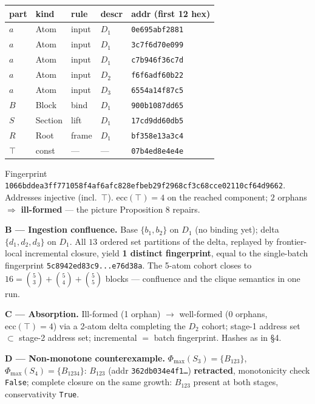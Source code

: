 \documentclass[
  10pt,
]{article}
\begin{document}
\begin{longtable}[]{@{}lllll@{}}
\toprule\noalign{}
part & kind & rule & descr & addr (first 12 hex) \\
\midrule\noalign{}
\endhead
\bottomrule\noalign{}
\endlastfoot
\(a\) & Atom & input & \(D_1\) & \texttt{0e695abf2881} \\
\(a\) & Atom & input & \(D_1\) & \texttt{3c7f6d70e099} \\
\(a\) & Atom & input & \(D_1\) & \texttt{c7b946f36c7d} \\
\(a\) & Atom & input & \(D_2\) & \texttt{f6f6adf60b22} \\
\(a\) & Atom & input & \(D_3\) & \texttt{6554a14f87c5} \\
\(B\) & Block & bind & \(D_1\) & \texttt{900b1087dd65} \\
\(S\) & Section & lift & \(D_1\) & \texttt{17cd9dd60db5} \\
\(R\) & Root & frame & \(D_1\) & \texttt{bf358e13a3c4} \\
\(\top\) & const & --- & --- & \texttt{07b4ed8e4e4e} \\
\end{longtable}

Fingerprint
\texttt{1066bddea3ff771058f4af6afc828efbeb29f2968cf3c68cce02110cf64d9662}.
Addresses injective (incl.~\(\top\)). \(\mathrm{ecc}(\top) = 4\) on the
reached component; \(2\) orphans \(\Rightarrow\) \textbf{ill-formed} ---
the picture Proposition 8 repairs.

\textbf{B --- Ingestion confluence.} Base \(\{b_1, b_2\}\) on \(D_1\)
(no binding yet); delta \(\{d_1, d_2, d_3\}\) on \(D_1\). All \(13\)
ordered set partitions of the delta, replayed by frontier-local
incremental closure, yield \textbf{1 distinct fingerprint}, equal to the
single-batch fingerprint \texttt{5c8942ed83c9...e76d38a}. The 5-atom
cohort closes to \(16 = \binom{5}{3} + \binom{5}{4} + \binom{5}{5}\)
blocks --- confluence and the clique semantics in one run.

\textbf{C --- Absorption.} Ill-formed (1 orphan) \(\to\) well-formed (0
orphans, \(\mathrm{ecc}(\top) = 4\)) via a 2-atom delta completing the
\(D_2\) cohort; stage-1 address set \(\subset\) stage-2 address set;
incremental \(=\) batch fingerprint. Hashes as in §4.

\textbf{D --- Non-monotone counterexample.}
\(\Phi_{\max}(S_3) = \{B_{123}\}\), \(\Phi_{\max}(S_4) = \{B_{1234}\}\):
\(B_{123}\) (addr \texttt{362db034e4f1…}) \textbf{retracted},
monotonicity check \texttt{False}; complete closure on the same growth:
\(B_{123}\) present at both stages, conservativity \texttt{True}.
\end{document}
